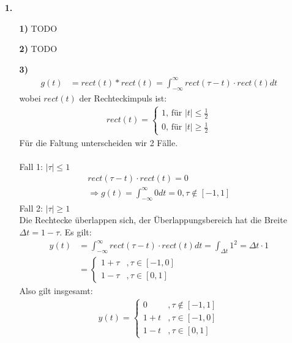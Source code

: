 \documentclass[a4paper,11pt]{article}
\author{\authorinfotitle}
\title{\titleinfo}
\date{\today}
\begin{document}
	\maketitle
	\begin{enumerate}
		\item[\textbf{1.}]
		\begin{enumerate}
			\item[\textbf{1)}]
				TODO
			\item[\textbf{2)}]
				TODO
			\item[\textbf{3)}]
			\begin{align*}
			g(t) &= rect(t) * rect(t) = \int_{- \infty}^{\infty}rect(\tau - t)\cdot rect(t)dt
			\end{align*}
			wobei $rect(t)$ der Rechteckimpuls ist:
			\begin{align*}
			rect(t) = 
			\begin{cases}
			1 \text{, für } |t| \leq \frac{1}{2} \\
			0 \text{, für } |t| \geq \frac{1}{2}
			\end{cases}
			\end{align*}
			Für die Faltung unterscheiden wir 2 Fälle. \\ \\
			Fall 1: $|\tau| \le 1$ \\
			\begin{align*}
			rect(\tau - t)\cdot rect(t) = 0 \\
			\Rightarrow g(t) = \int_{- \infty}^{\infty} 0 dt = 0 , \tau \not\in [-1, 1]
			\end{align*}
			Fall 2: $|\tau| \ge 1$ \\
			Die Rechtecke überlappen sich, der Überlappungsbereich hat die Breite $\Delta t = 1 - \tau$. Es gilt:
			\begin{align*}
			y(t) &= \int_{- \infty}^{\infty}rect(\tau - t)\cdot rect(t)dt = \int_{\Delta t} 1^2 = \Delta t \cdot 1 \\
			&= \begin{cases}
			1 + \tau &, \tau\in [-1, 0] \\
			1 - \tau &, \tau\in [0,1]
			\end{cases}
			\end{align*}
			Also gilt insgesamt:
			\begin{align*}
			y(t) =
			\begin{cases}
			0 &, \tau\not\in [-1,1] \\
			1 + t &, \tau\in [-1, 0] \\
			1 - t &, \tau\in [0,1]

\end{cases}
\end{align*}
\end{enumerate}
\end{enumerate}
\end{document}
